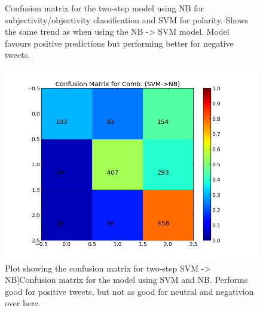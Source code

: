 \begin{minipage}[s]{\linewidth}
\begin{minipage}{0.45\linewidth}
\begin{figure}[H]
           \caption[Plot showing the confusion matrix for two-step NB -> MaxEnt]{Confusion matrix for the two-step model using NB for subjectivity/objectivity classification and SVM for polarity. Shows the same trend as when using the NB -> SVM model. Model favours positive predictions but performing better for negative tweets.}
           \label{fig:confmat_nb_maxent}
          \end{figure}
     \end{minipage}
\end{minipage}


\begin{minipage}[s]{\linewidth}
     \centering
     \begin{minipage}{0.45\linewidth}
           \begin{figure}[H]
                \includegraphics[width=\linewidth]{../img/plots/grid/confusion_matrix_Comb-SVM-NB.png}
         Plot showing the confusion matrix for two-step SVM -> NB]{Confusion matrix for the model using SVM and NB. Performs good for positive tweets, but not as good for neutral and negativion over here.}
            \label{fig:confmat_svm_nb}
           \end{figure}
      \end{minipage}
      \hspace{0.05\linewidth}
      \begin{minipage}{0.45\linewidth}
           \begin{figure}[H]

\end{figure}
\end{minipage}
\end{minipage}
